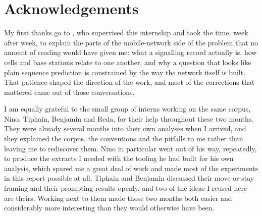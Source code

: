 \chapter*{Acknowledgements}
\thispagestyle{plain}

My first thanks go to \supervisor, who supervised this internship and took the
time, week after week, to explain the parts of the mobile-network side of the
problem that no amount of reading would have given me: what a signalling record
actually is, how cells and base stations relate to one another, and why a
question that looks like plain sequence prediction is constrained by the way the
network itself is built. That patience shaped the direction of the work, and most
of the corrections that mattered came out of those conversations.

I am equally grateful to the small group of interns working on the same corpus,
Nino, Tiphain, Benjamin and Reda, for their help throughout these two months.
They were already several months into their own analyses when I arrived, and they
explained the corpus, the conventions and the pitfalls to me rather than leaving
me to rediscover them. Nino in particular went out of his way, repeatedly, to
produce the extracts I needed with the tooling he had built for his own analysis,
which spared me a great deal of work and made most of the experiments in this
report possible at all. Tiphain and Benjamin discussed their move-or-stay framing
and their prompting results openly, and two of the ideas I reused here are
theirs. Working next to them made those two months both easier and considerably
more interesting than they would otherwise have been.
